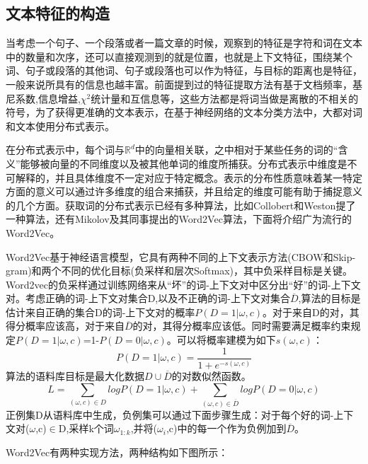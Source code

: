 \documentclass[UTF8]{ctexart}
\begin{document}
\subsection{文本特征的构造}
	当考虑一个句子、一个段落或者一篇文章的时候，观察到的特征是字符和词在文本中的数量和次序，还可以直接观测到的就是位置，也就是上下文特征，围绕某个词、句子或段落的其他词、句子或段落也可以作为特征，与目标的距离也是特征，一般来说所具有的信息也越丰富。前面提到过的特征提取方法有基于文档频率，基尼系数,信息增益,$\chi^2$统计量和互信息等，这些方法都是将词当做是离散的不相关的符号，为了获得更准确的文本表示，在基于神经网络的文本分类方法中，大都对词和文本使用分布式表示。
	\par 在分布式表示中，每个词与$\mathbb{R}^d$中的向量相关联，之中相对于某些任务的词的“含义”能够被向量的不同维度以及被其他单词的维度所捕获。分布式表示中维度是不可解释的，并且具体维度不一定对应于特定概念。表示的分布性质意味着某一特定方面的意义可以通过许多维度的组合来捕获，并且给定的维度可能有助于捕捉意义的几个方面。获取词的分布式表示已经有多种算法，比如Collobert和Weston提了一种算法，还有Mikolov及其同事提出的Word2Vec算法，下面将介绍广为流行的Word2Vec。
	\par Word2Vec基于神经语言模型，它具有两种不同的上下文表示方法(CBOW和Skip-gram)和两个不同的优化目标(负采样和层次Softmax)，其中负采样目标是关键。Word2vec的负采样通过训练网络来从“坏”的词-上下文对中区分出“好”的词-上下文对。考虑正确的词-上下文对集合D,以及不正确的词-上下文对集合$\overline{D}$,算法的目标是估计来自正确的集合D的词-上下文对的概率$P(D=1 \vert \omega, c)$。对于来自D的对，其得分概率应该高，对于来自$\overline{D}$的对，其得分概率应该低。同时需要满足概率约束规定$P(D=1 \vert \omega, c)$=1-$P(D=0 \vert \omega, c)$。可以将概率建模为如下$s(\omega,c)$：
	\begin{displaymath}
		P(D=1 \vert \omega, c)=\frac{1}{1+e^{-s(\omega,c)}}
	\end{displaymath}
	算法的语料库目标是最大化数据$D\cup \overline{D}$的对数似然函数。
	\begin{displaymath}
		L = \sum_{(\omega,c)\in D}logP(D=1 \vert \omega, c) + \sum_{(\omega,c)\in \overline{D}}logP(D=0 \vert \omega, c)
	\end{displaymath}
	正例集D从语料库中生成，负例集可以通过下面步骤生成：对于每个好的词-上下文对($\omega$,c)$\in$D,采样k个词$\omega_{1:k}$,并将($\omega_i$,c)中的每一个作为负例加到$\overline{D}$。
	\par Word2Vec有两种实现方法，两种结构如下图所示：
\end{document}
